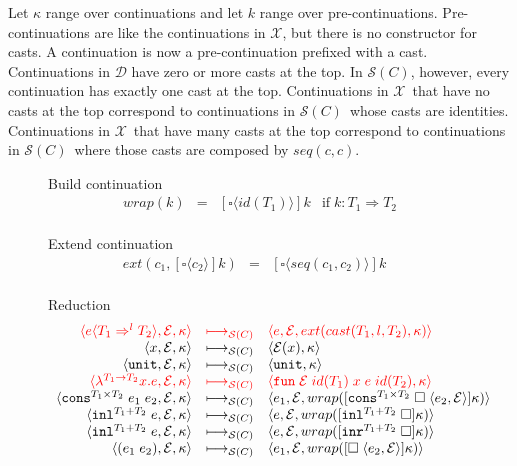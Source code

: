 \documentclass[acmsmall,review,anonymous]{acmart}\settopmatter{printfolios=true,printccs=false,printacmref=false}
\newcommand{\funrule}[3]{#1 &=& #2 & #3\\}
\newcommand{\plus}[0]{+}
\newcommand{\sOOinspect}[3]{\langle#1,#2,#3\rangle}
\newcommand{\sOOreturn}[2]{\langle#1,#2\rangle}
\newcommand{\POOprod}[2]{#1 \times #2}
\newcommand{\POOsum}[2]{#1 \plus #2}
\newcommand{\eOOvar}[1]{#1}
\newcommand{\eOOsole}[0]{\mathtt{unit}}
\newcommand{\eOOlam}[4]{\lambda^{#1\rightarrow{}#2}#3.#4}
\newcommand{\eOOapp}[2]{(#1 \; #2)}
\newcommand{\eOOcons}[4]{\mathtt{cons}^{\POOprod{#1}{#2}} \; #3 \; #4}
\newcommand{\eOOinl}[3]{\mathtt{inl}^{\POOsum{#1}{#2}} \; #3}
\newcommand{\eOOcast}[4]{#1 \langle \cOOcast{#2}{#3}{#4} \rangle}
\newcommand{\cOOcast}[3]{#1 \Rightarrow^{#2} #3}
\newcommand{\kOOconsI}[5]{
	[\mathtt{cons}^{\POOprod{#1}{#2}} \; \square \; \langle#3,#4\rangle ]#5}
\newcommand{\kOOinl}[3]{[\mathtt{inl}^{\POOsum{#1}{#2}}\; \square]#3}
\newcommand{\kOOinr}[3]{[\mathtt{inr}^{\POOsum{#1}{#2}}\; \square]#3}
\newcommand{\kOOappI}[3]{
  [\square \; \langle#1,#2\rangle]#3
}
\newcommand{\kOOcast}[2]{
  [\square \langle #1 \rangle]#2}
\newcommand{\hcvOOfun}[5]{\mathtt{fun} \; #2 \; #1 \; #3 \; #4 \; #5}
\newcommand{\hcvOOtt}[0]{\mathtt{unit}}
\newcommand{\sidecond}[1]{\text{if}\;#1}
\newcommand{\judgeSreduce}[3]{#2 \longmapsto_{\mathcal{S}(#1)} #3}
\newcommand{\redruleS}[3]{#1 & \longmapsto_{\mathcal{S}(C)} & #2 & #3\\}
\newcommand{\hiredruleS}[3]{\highlight{#1} & 
\highlight{\longmapsto_{\mathcal{S}(C)}} & \highlight{#2} & \highlight{#3} \\}
\newcommand{\ineffCEK}{\ensuremath{\mathcal{X}}}
\newcommand{\ineffCEKD}{\ensuremath{\mathcal{D}}}
\newcommand{\effCEK}[1]{\ensuremath{\mathcal{S}(#1)}}
\newcommand{\highlight}[1]{{\color{red} #1}}
\begin{document}
Let $\kappa$ range over continuations and let $k$ range over
pre-continuations.
%
Pre-continuations are like the continuations in \ineffCEK{}, but there is no 
constructor for casts.
%
A continuation is now a pre-continuation prefixed with a cast.
%
Continuations in \ineffCEKD{} have zero or more casts at the top.  In 
\effCEK{C}, however, every continuation has exactly one cast at the top.
Continuations in \ineffCEK\ that have no casts at the top correspond
to continuations in \effCEK{C}\ whose casts are identities.
Continuations in \ineffCEK\ that have many casts at the top correspond
to continuations in \effCEK{C}\ where those casts are composed by
$seq(c,c)$.


\begin{figure} 
  Build continuation 
  \[
  \begin{array}{rclc}
  \funrule{wrap(k)}{\kOOcast{id(T_1)}{k}}{
    \sidecond{k : T_1 \Longrightarrow T_2}}
  \end{array}
  \]
  
  Extend continuation 
  \[
  \begin{array}{rclc}
  \funrule{ext(c_1,\kOOcast{c_2}{k})}{
    \kOOcast{seq(c_1,c_2)}{k}
  }{}
  \end{array}
  \]

  Reduction \fbox{$\judgeSreduce{C}{s}{s}$}
  \[
  \begin{array}{rclr}
  \hiredruleS{
    \sOOinspect{\eOOcast{e}{T_1}{l}{T_2}}{\mathcal{E}}{\kappa}
  }{
    \sOOinspect{e}{\mathcal{E}}{ext(cast(T_1,l,T_2),\kappa)}
  }{}
  \redruleS{
    \sOOinspect{\eOOvar{x}}{\mathcal{E}}{\kappa}
  }{  
    \sOOreturn{\mathcal{E}(x)}{\kappa}
  }{}
  \redruleS{
    \sOOinspect{\eOOsole}{\mathcal{E}}{\kappa}
  }{
    \sOOreturn{\hcvOOtt}{\kappa}
  }{}
  \hiredruleS{
    \sOOinspect{\eOOlam{T_1}{T_2}{x}{e}}{\mathcal{E}}{\kappa}
  }{
    \sOOreturn{\hcvOOfun{id(T_1)}{\mathcal{E}}{x}{e}{id(T_2)}}{\kappa}
  }{}
  \redruleS{
    \sOOinspect{\eOOcons{T_1}{T_2}{e_1}{e_2}}{\mathcal{E}}{\kappa}
  }{
    \sOOinspect{e_1}{\mathcal{E}}{
      wrap(\kOOconsI{T_1}{T_2}{e_2}{\mathcal{E}}{\kappa})
    }
  }{}
  \redruleS{
    \sOOinspect{\eOOinl{T_1}{T_2}{e}}{\mathcal{E}}{\kappa}
  }{
    \sOOinspect{e}{\mathcal{E}}{wrap(\kOOinl{T_1}{T_2}{\kappa})}
  }{}
  \redruleS{
    \sOOinspect{\eOOinl{T_1}{T_2}{e}}{\mathcal{E}}{\kappa}
  }{
    \sOOinspect{e}{\mathcal{E}}{wrap(\kOOinr{T_1}{T_2}{\kappa})}
  }{}
  \redruleS{
    \sOOinspect{\eOOapp{e_1}{e_2}}{\mathcal{E}}{\kappa}
  }{
    \sOOinspect{e_1}{\mathcal{E}}{wrap(\kOOappI{e_2}{\mathcal{E}}{\kappa})}}{}
  

\end{array}\]
\end{figure}
\end{document}
